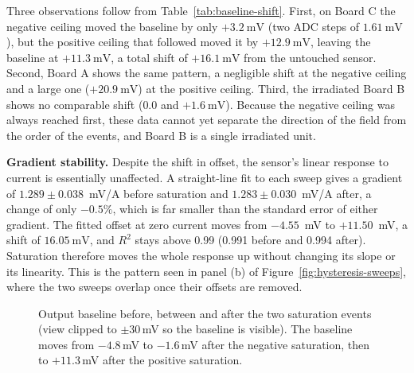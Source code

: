 \documentclass[12pt,a4paper]{article}
\begin{document}
Three observations follow from Table~\ref{tab:baseline-shift}. First, on Board C the negative ceiling moved the baseline by only $+\SI{3.2}{\milli\volt}$ (two ADC steps of $\SI{1.61}{\milli\volt}$), but the positive ceiling that followed moved it by $+\SI{12.9}{\milli\volt}$, leaving the baseline at $+\SI{11.3}{\milli\volt}$, a total shift of $+\SI{16.1}{\milli\volt}$ from the untouched sensor. Second, Board A shows the same pattern, a negligible shift at the negative ceiling and a large one ($+\SI{20.9}{\milli\volt}$) at the positive ceiling. Third, the irradiated Board B shows no comparable shift ($0.0$ and $+\SI{1.6}{\milli\volt}$). Because the negative ceiling was always reached first, these data cannot yet separate the direction of the field from the order of the events, and Board B is a single irradiated unit.

\textbf{Gradient stability.} Despite the shift in offset, the sensor's linear response to current is essentially unaffected. A straight-line fit to each sweep gives a gradient of $1.289 \pm 0.038$~mV/A before saturation and $1.283 \pm 0.030$~mV/A after, a change of only $-0.5\%$, which is far smaller than the standard error of either gradient. The fitted offset at zero current moves from $-4.55$~mV to $+11.50$~mV, a shift of $\SI{16.05}{\milli\volt}$, and $R^2$ stays above 0.99 (0.991 before and 0.994 after). Saturation therefore moves the whole response up without changing its slope or its linearity. This is the pattern seen in panel (b) of Figure~\ref{fig:hysteresis-sweeps}, where the two sweeps overlap once their offsets are removed.

 
\begin{figure}[H]
\centering
{}
\caption{Output baseline before, between and after the two saturation events (view clipped to $\pm30$\,mV so the baseline is visible). The baseline moves from $-4.8$\,mV to $-1.6$\,mV after the negative saturation, then to $+11.3$\,mV after the positive saturation.}
\label{fig:mh-baseline}
\end{figure}
 
\end{document}
